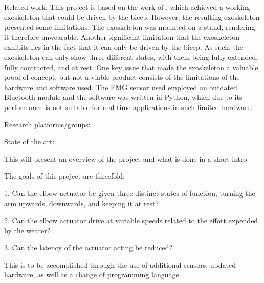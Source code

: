     Related work: %
        This project is based on the work of \cite{AFES}, which achieved a working exoskeleton that could be driven by the bicep. However, the resulting 
        exoskeleton presented some limitations. The exoskeleton was mounted on a stand, rendering it therefore unwearable. Another significant limitation 
        that the exoskeleton exhibits lies in the fact that it can only be driven by the bicep. As such, the exoskeleton can only show three different states, 
        with them being fully extended, fully contracted, and at rest. One key issue that made the exoskeleton a valuable proof of concept, but not a viable 
        product consists of the limitations of the hardware and software used. The EMG sensor used employed an outdated Bluetooth module and the software was 
        written in Python, which due to its performance is not suitable for real-time applications in such limited hardware.

    Research platforms/groups:

    State of the art:


    This will present an overview of the project and what is done in a short intro


The goals of this project are threefold:

1. Can the elbow actuator be given three distinct states of function, turning the arm upwards, downwards, and keeping it at rest?

2. Can the elbow actuator drive at variable speeds related to the effort expended by the wearer?

3. Can the latency of the actuator acting be reduced?

This is to be accomplished through the use of additional sensors, updated hardware, as well as a change of programming language.